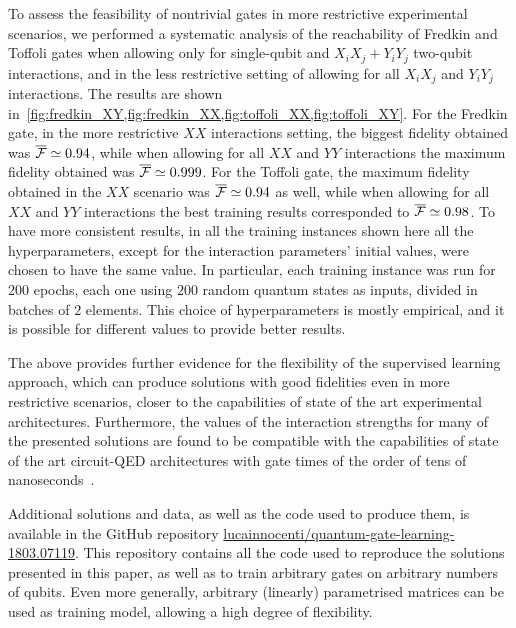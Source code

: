 To assess the feasibility of nontrivial gates in more restrictive experimental scenarios, we performed a systematic analysis of the reachability of Fredkin and Toffoli gates when allowing only for single-qubit and $X_i X_j+Y_i Y_j$ two-qubit interactions, and in the less restrictive setting of allowing for all $X_i X_j$ and $Y_i Y_j$ interactions.
The results are shown in~\cref{fig:fredkin_XY,fig:fredkin_XX,fig:toffoli_XX,fig:toffoli_XY}.
For the Fredkin gate, in the more restrictive $XX$ interactions setting, the biggest fidelity obtained was $\overline{{\mathcal{F}}}\simeq 0.94$, while when allowing for all $XX$ and $YY$ interactions the maximum fidelity obtained was $\overline{{\mathcal{F}}}\simeq0.999$.
For the Toffoli gate, the maximum fidelity obtained in the $XX$ scenario was $\overline{{\mathcal{F}}}\simeq0.94$ as well, while when allowing for all $XX$ and $YY$ interactions the best training results corresponded to $\overline{{\mathcal{F}}}\simeq 0.98$.
To have more consistent results, in all the training instances shown here all the hyperparameters, except for the interaction parameters' initial values, were chosen to have the same value.
In particular, each training instance was run for $200$ epochs, each one using $200$ random quantum states as inputs, divided in batches of $2$ elements.
This choice of hyperparameters is mostly empirical, and it is possible for different values to provide better results.


The above provides further evidence for the flexibility of the supervised learning approach, which can produce solutions with good fidelities even in more restrictive scenarios, closer to the capabilities of state of the art experimental architectures.
Furthermore, the values of the interaction strengths for many of the presented solutions are found to be compatible with the capabilities of state of the art circuit-QED architectures with gate times of the order of tens of nanoseconds~\cite{potocnik2018studying}.

Additional solutions and data, as well as the code used to produce them, is available in the GitHub repository
\href{https://github.com/lucainnocenti/quantum-gate-learning-1803.07119}{lucainnocenti/quantum-gate-learning-1803.07119}.
This repository contains all the code used to reproduce the solutions presented in this paper, as well as to train arbitrary gates on arbitrary numbers of qubits.
Even more generally, arbitrary (linearly) parametrised matrices can be used as training model, allowing a high degree of flexibility.

